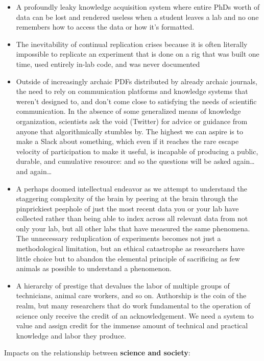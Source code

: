 \documentclass[11pt]{article}
\begin{document}
\begin{multicols}{2}
\begin{itemize}
\item
  A profoundly leaky knowledge acquisition system where entire PhDs
  worth of data can be lost and rendered useless when a student leaves a
  lab and no one remembers how to access the data or how it's formatted.
\item
  The inevitability of continual replication crises because it is often
  literally impossible to replicate an experiment that is done on a rig
  that was built one time, used entirely in-lab code, and was never
  documented
\item
  Outside of increasingly archaic PDFs distributed by already archaic
  journals, the need to rely on communication platforms and knowledge
  systems that weren't designed to, and don't come close to satisfying
  the needs of scientific communication. In the absence of some
  generalized means of knowledge organization, scientists ask the void
  (Twitter) for advice or guidance from anyone that algorithmically
  stumbles by. The highest we can aspire is to make a Slack about
  something, which even if it reaches the rare escape velocity of
  participation to make it useful, is incapable of producing a public,
  durable, and cumulative resource: and so the questions will be asked
  again\ldots{} and again\ldots{}
\item
  A perhaps doomed intellectual endeavor as we attempt to understand the staggering
  complexity of the brain by peering at the brain through the
  pinprickiest peephole of just the most recent data you or your lab
  have collected rather than being able to index across all relevant
  data from not only your lab, but all other labs that have measured the
  same phenomena. The unnecessary reduplication of experiments becomes
  not just a methodological limitation, but an ethical catastrophe as
  researchers have little choice but to abandon the elemental principle
  of sacrificing as few animals as possible to understand a phenomenon.
\item
  A hierarchy of prestige that devalues the labor of multiple groups of
  technicians, animal care workers, and so on. Authorship is the coin of
  the realm, but many researchers that do work fundamental to the
  operation of science only receive the credit of an acknowledgement. We
  need a system to value and assign credit for the immense amount of
  technical and practical knowledge and labor they produce.
\end{itemize}

Impacts on the relationship between \textbf{science and society}:


\end{multicols}
\end{document}
